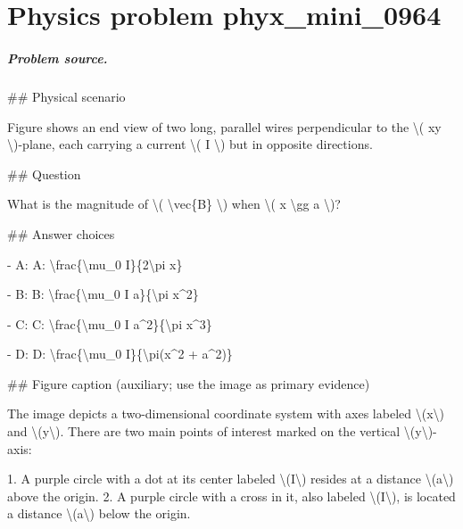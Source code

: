 
\chapter{Physics problem phyx\_mini\_0964}
\label{ch:PhyXMiniProblems_problem_phyx_mini_0964}

\paragraph{Problem source.}
\#\# Physical scenario

Figure shows an end view of two long, parallel wires perpendicular to the \textbackslash{}( xy \textbackslash{})-plane, each carrying a current \textbackslash{}( I \textbackslash{}) but in opposite directions.

\#\# Question

What is the magnitude of \textbackslash{}( \textbackslash{}vec\{B\} \textbackslash{}) when \textbackslash{}( x \textbackslash{}gg a \textbackslash{})?

\#\# Answer choices

- A: A: \textbackslash{}frac\{\textbackslash{}mu\_0 I\}\{2\textbackslash{}pi x\}

- B: B: \textbackslash{}frac\{\textbackslash{}mu\_0 I a\}\{\textbackslash{}pi x\textasciicircum{}2\}

- C: C: \textbackslash{}frac\{\textbackslash{}mu\_0 I a\textasciicircum{}2\}\{\textbackslash{}pi x\textasciicircum{}3\}

- D: D: \textbackslash{}frac\{\textbackslash{}mu\_0 I\}\{\textbackslash{}pi(x\textasciicircum{}2 + a\textasciicircum{}2)\}

\#\# Figure caption (auxiliary; use the image as primary evidence)

The image depicts a two-dimensional coordinate system with axes labeled \textbackslash{}(x\textbackslash{}) and \textbackslash{}(y\textbackslash{}). There are two main points of interest marked on the vertical \textbackslash{}(y\textbackslash{})-axis:

1. A purple circle with a dot at its center labeled \textbackslash{}(I\textbackslash{}) resides at a distance \textbackslash{}(a\textbackslash{}) above the origin.
2. A purple circle with a cross in it, also labeled \textbackslash{}(I\textbackslash{}), is located a distance \textbackslash{}(a\textbackslash{}) below the origin.

